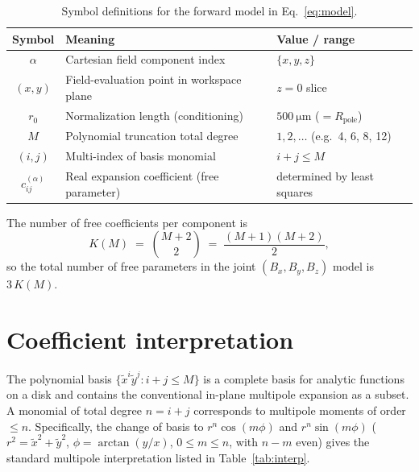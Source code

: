\documentclass[11pt]{article}
\begin{document}
\begin{table}[htbp]
\centering
\caption{Symbol definitions for the forward model in
         Eq.~\eqref{eq:model}.}
\label{tab:symbols}
\begin{tabular}{c l l}
\toprule
Symbol & Meaning & Value / range \\
\midrule
$\alpha$           & Cartesian field component index & $\{x, y, z\}$ \\
$(x, y)$           & Field-evaluation point in workspace plane &
                     $z = 0$ slice \\
$r_0$              & Normalization length (conditioning) &
                     $\SI{500}{\micro\metre}$ ($= R_{\text{pole}}$) \\
$M$                & Polynomial truncation total degree &
                     $1, 2, \dots$ (e.g.\ 4, 6, 8, 12) \\
$(i, j)$           & Multi-index of basis monomial & $i + j \le M$ \\
$c^{(\alpha)}_{ij}$ & Real expansion coefficient (free parameter)
                     & determined by least squares \\
\bottomrule
\end{tabular}
\end{table}

The number of free coefficients per component is
%
\begin{equation}
\label{eq:dof}
K(M) \;=\; \binom{M + 2}{2} \;=\; \frac{(M+1)(M+2)}{2},
\end{equation}
%
so the total number of free parameters in the joint
$(B_x, B_y, B_z)$ model is $3\,K(M)$.

\section{Coefficient interpretation}
\label{sec:interpretation}

The polynomial basis
$\{\tilde{x}^{i} \tilde{y}^{j} : i + j \le M\}$
is a complete basis for analytic functions on a disk and contains
the conventional in-plane multipole expansion as a subset.
A monomial of total degree $n = i + j$ corresponds to multipole
moments of order $\le n$. Specifically, the change of basis to
$r^{n} \cos(m\phi)$ and $r^{n} \sin(m\phi)$
($r^{2} = \tilde{x}^{2} + \tilde{y}^{2}$,
$\phi = \arctan(y/x)$, $0 \le m \le n$, with $n - m$ even)
gives the standard multipole interpretation listed in
Table~\ref{tab:interp}.
\end{document}
